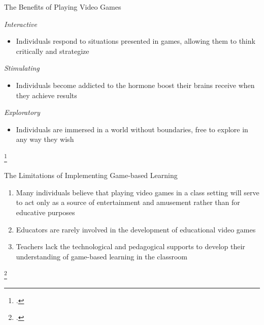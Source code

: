 \documentclass{beamer}
\begin{document}

	\begin{frame}{The Benefits of Playing Video Games}
		
		\begin{block}{\textit{Interactive}}
			 \begin{itemize}
			 \item Individuals respond to situations presented in games, allowing them to think critically and strategize
			 \end{itemize}
		\end{block} \pause
	
		\begin{block}{\textit{Stimulating}}
			\begin{itemize}
				\item Individuals become addicted to the hormone boost their brains receive when they achieve results
			\end{itemize}
		\end{block} \pause
	
		\begin{block}{\textit{Exploratory}}
			\begin{itemize}
				\item Individuals are immersed in a world without boundaries, free to explore in any way they wish
			\end{itemize}
		\end{block}
	
	{\tiny\footcite{coller2009effectiveness, tomavska2022let}}
	
	\end{frame}

	\begin{frame}{The Limitations of Implementing Game-based Learning}
		\begin{enumerate}
			\item Many individuals believe that playing video games in a class setting will serve to act only as a source of entertainment and amusement rather than for educative purposes \newline 
			\item Educators are rarely involved in the development of educational video games \newline
			\item Teachers lack the technological and pedagogical supports to develop their understanding of game-based learning in the classroom 
			
		\end{enumerate}
	
	{\tiny\footcite{lister2015gamification,mayer2010adding,molin2017role,fishman2014empowering}}
		
	\end{frame}
\end{document}
